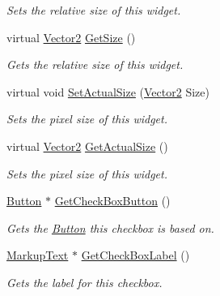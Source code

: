 \begin{DoxyCompactItemize}
\begin{DoxyCompactList}\small\item\em Sets the relative size of this widget. \item\end{DoxyCompactList}\item 
virtual \hyperlink{classphys_1_1Vector2}{Vector2} \hyperlink{classphys_1_1UI_1_1CheckBox_a99c6ab5087522fbd4825032b9a058585}{GetSize} ()
\begin{DoxyCompactList}\small\item\em Gets the relative size of this widget. \item\end{DoxyCompactList}\item 
virtual void \hyperlink{classphys_1_1UI_1_1CheckBox_aa3226d72a70e734996b58a8782e24924}{SetActualSize} (\hyperlink{classphys_1_1Vector2}{Vector2} Size)
\begin{DoxyCompactList}\small\item\em Sets the pixel size of this widget. \item\end{DoxyCompactList}\item 
virtual \hyperlink{classphys_1_1Vector2}{Vector2} \hyperlink{classphys_1_1UI_1_1CheckBox_aa13946ced3947a13f8f30dd97ffba245}{GetActualSize} ()
\begin{DoxyCompactList}\small\item\em Sets the pixel size of this widget. \item\end{DoxyCompactList}\item 
\hyperlink{classphys_1_1UI_1_1Button}{Button} $\ast$ \hyperlink{classphys_1_1UI_1_1CheckBox_a728de15a5c8e512fd3fbb2b8a3f808ee}{GetCheckBoxButton} ()
\begin{DoxyCompactList}\small\item\em Gets the \hyperlink{classphys_1_1UI_1_1Button}{Button} this checkbox is based on. \item\end{DoxyCompactList}\item 
\hyperlink{classphys_1_1UI_1_1MarkupText}{MarkupText} $\ast$ \hyperlink{classphys_1_1UI_1_1CheckBox_a5f37379e69ef1259ab48c37a8dc200e9}{GetCheckBoxLabel} ()
\begin{DoxyCompactList}\small\item\em Gets the label for this checkbox. \item\end{DoxyCompactList}\end{DoxyCompactItemize}

